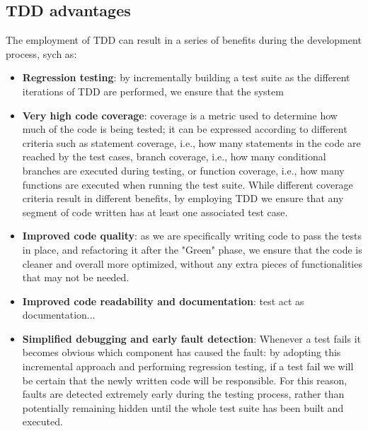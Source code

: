 \subsection{TDD advantages}
The employment of TDD can result in a series of benefits during the development process, sych as:
\begin{itemize}
    \item \textbf{Regression testing}: by incrementally building a test suite as the different iterations of TDD are performed, we ensure that the system  
    \item \textbf{Very high code coverage}: coverage is a metric used to determine how much of the code is being tested; it can be expressed according to different criteria such as statement coverage, i.e., how many statements in the code are reached by the test cases, branch coverage, i.e., how many conditional branches are executed during testing, or function coverage, i.e., how many functions are executed when running the test suite. While different coverage criteria result in different benefits, by employing TDD we ensure that any segment of code written has at least one associated test case.
    \item \textbf{Improved code quality}: as we are specifically writing code to pass the tests in place, and refactoring it after the "Green" phase, we ensure that the code is cleaner and overall more optimized, without any extra pieces of functionalities that may not be needed. 
    \item \textbf{Improved code readability and documentation}: test act as documentation...
    \item \textbf{Simplified debugging and early fault detection}: Whenever a test fails it becomes obvious which component has caused the fault: by adopting this incremental approach and performing regression testing, if a test fail we will be certain that the newly written code will be responsible. For this reason, faults are detected extremely early during the testing process, rather than potentially remaining hidden until the whole test suite has been built and executed.
\end{itemize}


